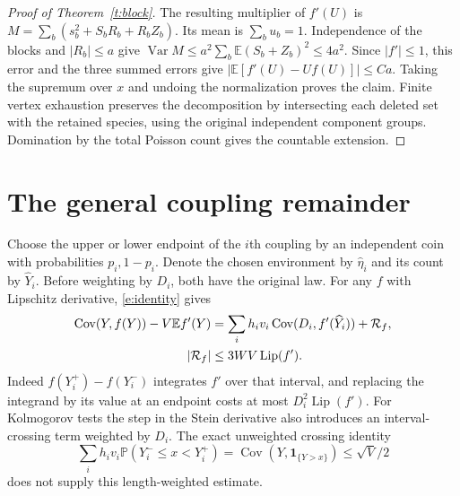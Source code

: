 \documentclass[11pt]{article}
\newcommand{\E}{\mathbb E}
\newcommand{\Prb}{\mathbb P}
\newcommand{\Var}{\operatorname{Var}}
\newcommand{\Cov}{\operatorname{Cov}}
\newcommand{\ind}{\mathbf1}
\numberwithin{equation}{section}
\begin{document}
\begin{proof}[Proof of Theorem~\ref{t:block}]
The resulting multiplier of $f'(U)$ is
$M=\sum_b(s_b^2+S_bR_b+R_bZ_b)$. Its mean is $\sum_b u_b=1$.
Independence of the blocks and $|R_b|\le a$ give
$\Var M\le a^2\sum_b\E(S_b+Z_b)^2\le4a^2$.
Since $|f'|\le1$, this error and the three summed errors give
$|\E[f'(U)-Uf(U)]|\le Ca$. Taking the supremum over $x$ and undoing the
normalization proves the claim. Finite vertex exhaustion preserves the decomposition
by intersecting each deleted set with the retained species, using the original
independent component groups. Domination by the total Poisson count gives the
countable extension.
\end{proof}

\section{The general coupling remainder}
Choose the upper or lower endpoint of the $i$th coupling by an independent coin
with probabilities $p_i,1-p_i$. Denote the chosen environment by $\widehat\eta_i$
and its count by $\widehat Y_i$. Before weighting by $D_i$, both have the original law.
For any $f$ with Lipschitz derivative, \eqref{e:identity} gives
\begin{align}
 \Cov(Y,f(Y))-V\E f'(Y)
 &=\sum_i h_i v_i\Cov(D_i,f'(\widehat Y_i))+\mathcal R_f,\notag\\
 |\mathcal R_f|&\le3WV\operatorname{Lip}(f').\label{e:gap}
\end{align}
Indeed $f(Y_i^+)-f(Y_i^-)$ integrates $f'$ over that interval, and replacing the
integrand by its value at an endpoint costs at most $D_i^2\operatorname{Lip}(f')$.
For Kolmogorov tests the step in the Stein derivative also introduces an interval-crossing
term weighted by $D_i$. The exact unweighted crossing identity
\[
 \sum_i h_i v_i\Prb(Y_i^-\le x<Y_i^+)=\Cov(Y,\ind_{\{Y>x\}})\le\sqrt V/2
\]
does not supply this length-weighted estimate.
\end{document}
